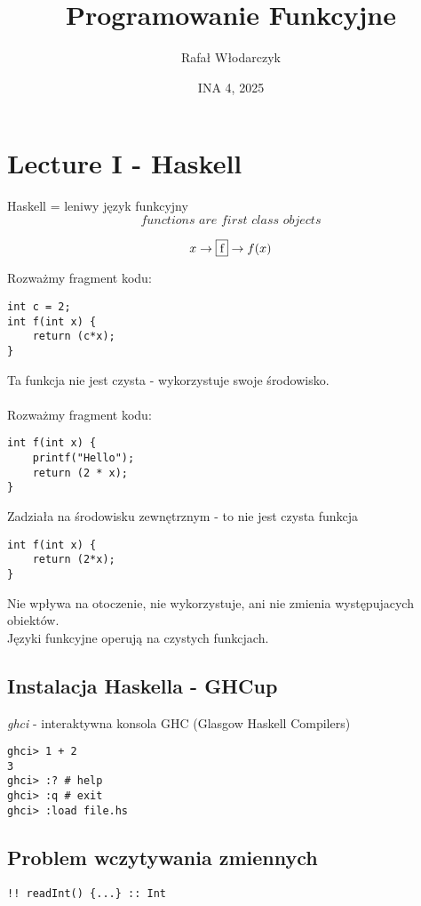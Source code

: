 \documentclass{article}
\title{Programowanie Funkcyjne}
\author{Rafał Włodarczyk}
\date{INA 4, 2025}
\begin{document}
\maketitle

\tableofcontents

\section{Lecture I - Haskell}

Haskell = leniwy język funkcyjny\\

\[
    \textit{functions are first class objects}
\]

\[
    x \rightarrow \fbox{f} \rightarrow f(x)
\]

\noindent
Rozważmy fragment kodu:
\begin{verbatim}
int c = 2;
int f(int x) {
    return (c*x);
}
\end{verbatim}
Ta funkcja nie jest czysta - wykorzystuje swoje środowisko.\\\\
Rozważmy fragment kodu:
\begin{verbatim}
int f(int x) {
    printf("Hello");
    return (2 * x);
}
\end{verbatim}
Zadziała na środowisku zewnętrznym - to nie jest czysta funkcja
\begin{verbatim}
int f(int x) {
    return (2*x);
}
\end{verbatim}
Nie wpływa na otoczenie, nie wykorzystuje, ani nie zmienia występujacych obiektów.\\
Języki funkcyjne operują na czystych funkcjach.

\subsection{Instalacja Haskella - GHCup}

\textit{ghci} - interaktywna konsola GHC (Glasgow Haskell Compilers)

\begin{verbatim}
ghci> 1 + 2
3
ghci> :? # help
ghci> :q # exit
ghci> :load file.hs
\end{verbatim}

\subsection{Problem wczytywania zmiennych}

\begin{verbatim}
!! readInt() {...} :: Int
\end{verbatim}
\end{document}
